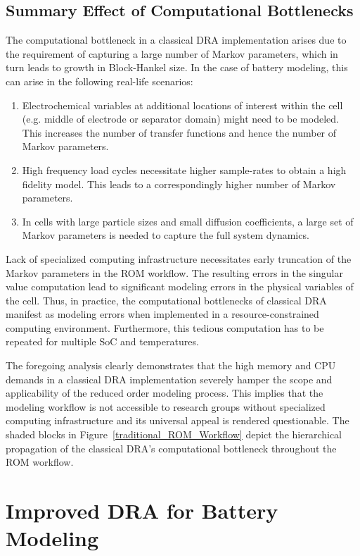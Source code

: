 \subsection{Summary Effect of Computational Bottlenecks\label{subsec:Summary-Effect-of}}

The computational bottleneck in a classical DRA implementation arises
due to the requirement of capturing a large number of Markov parameters,
which in turn leads to growth in Block-Hankel size. In the case of
battery modeling, this can arise in the following real-life scenarios:
\begin{enumerate}
	\item Electrochemical variables at additional locations of interest within
	the cell (e.g. middle of electrode or separator domain) might need
	to be modeled. This increases the number of transfer functions and
	hence the number of Markov parameters.
	\item High frequency load cycles necessitate higher sample-rates to obtain
	a high fidelity model. This leads to a correspondingly higher number
	of Markov parameters.
	\item In cells with large particle sizes and small diffusion coefficients,
	a large set of Markov parameters is needed to capture the full system
	dynamics.
\end{enumerate}
Lack of specialized computing infrastructure necessitates early truncation
of the Markov parameters in the ROM workflow. The resulting errors
in the singular value computation lead to significant modeling errors
in the physical variables of the cell. Thus, in practice, the computational
bottlenecks of classical DRA manifest as modeling errors when implemented
in a resource-constrained computing environment. Furthermore, this
tedious computation has to be repeated for multiple SoC and temperatures.

The foregoing analysis clearly demonstrates that the high memory and
CPU demands in a classical DRA implementation severely hamper the
scope and applicability of the reduced order modeling process. This
implies that the modeling workflow is not accessible to research groups
without specialized computing infrastructure and its universal appeal
is rendered questionable. The shaded blocks in Figure~\ref{traditional_ROM_Workflow}
depict the hierarchical propagation of the classical DRA's computational
bottleneck throughout the ROM workflow.

\section{Improved DRA for Battery Modeling \label{sec:Efficient-Computation-of}}

